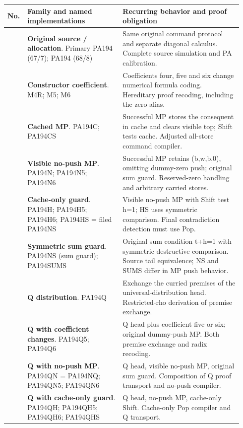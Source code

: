 \begingroup\small
\begin{longtable}{@{}>{\raggedright\arraybackslash}p{0.06\linewidth}>{\raggedright\arraybackslash}p{0.39\linewidth}>{\raggedright\arraybackslash}p{0.49\linewidth}@{}}
\toprule No. & Family and named implementations & Recurring behavior and proof obligation\\\midrule\endhead
1 & \textbf{Original source / allocation}. Primary PA194 (67/7); PA194 (68/8) & Same original command protocol and separate diagonal calculus. Complete source simulation and PA calibration.\\[5pt]
2 & \textbf{Constructor coefficient}. M4R; M5; M6 & Coefficients four, five and six change numerical formula coding. Hereditary proof recoding, including the zero alias.\\[5pt]
3 & \textbf{Cached MP}. PA194C; PA194CS & Successful MP stores the consequent in cache and clears visible top; Shift tests cache. Adjusted all-store command compiler.\\[5pt]
4 & \textbf{Visible no-push MP}. PA194N; PA194N5; PA194N6 & Successful MP retains (b,w,b,0), omitting dummy-zero push; original sum guard. Reserved-zero handling and arbitrary carried stores.\\[5pt]
5 & \textbf{Cache-only guard}. PA194H; PA194H5; PA194H6; PA194HS = filed PA194NS & Visible no-push MP with Shift test h=1; HS uses symmetric comparison. Final contradiction detection must use Pop.\\[5pt]
6 & \textbf{Symmetric sum guard}. PA194NS (sum guard); PA194SUMS & Original sum condition t+h=1 with symmetric destructive comparison. Source tail equivalence; NS and SUMS differ in MP push behavior.\\[5pt]
7 & \textbf{Q distribution}. PA194Q & Exchange the curried premises of the universal-distribution head. Restricted-rho derivation of premise exchange.\\[5pt]
8 & \textbf{Q with coefficient changes}. PA194Q5; PA194Q6 & Q head plus coefficient five or six; original dummy-push MP. Both premise exchange and radix recoding.\\[5pt]
9 & \textbf{Q with no-push MP}. PA194QN = PA194NQ; PA194QN5; PA194QN6 & Q head, visible no-push MP, original sum guard. Composition of Q proof transport and no-push compiler.\\[5pt]
10 & \textbf{Q with cache-only guard}. PA194QH; PA194QH5; PA194QH6; PA194QHS & Q head, no-push MP, cache-only Shift. Cache-only Pop compiler and Q transport.\\[5pt]

\end{longtable}
